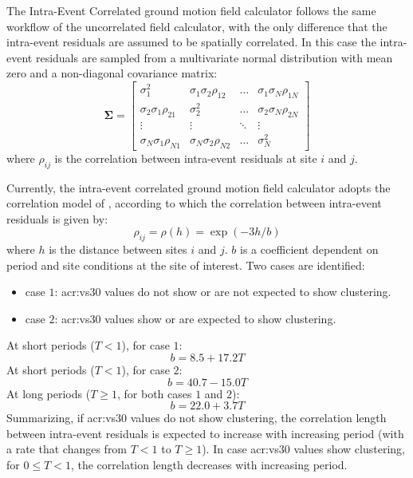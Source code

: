 The Intra-Event Correlated ground motion field calculator follows the same 
workflow of the uncorrelated field calculator, with the only difference that 
the intra-event residuals are assumed to be spatially correlated. 
%
In this case the intra-event residuals are sampled from a multivariate 
normal distribution with mean zero and a non-diagonal covariance matrix:
\begin{equation}
\bm{\Sigma}=
\begin{bmatrix}
\sigma^{2}_{1} &  \sigma_{1}\sigma_{2}\rho_{12}  & \ldots &  \sigma_{1}\sigma_{N}\rho_{1N}\\
\sigma_{2}\sigma_{1}\rho_{21}  &  \sigma^{2}_{2} & \ldots &  \sigma_{2}\sigma_{N}\rho_{2N}\\
\vdots & \vdots & \ddots & \vdots\\
\sigma_{N}\sigma_{1}\rho_{N1}  &   \sigma_{N}\sigma_{2}\rho_{N2}       &\ldots & \sigma^{2}_{N}
\end{bmatrix}
\end{equation}
where $\rho_{ij}$ is the correlation between intra-event residuals at site 
$i$ and $j$.

Currently, the intra-event correlated ground motion field calculator adopts 
the correlation model of \citet{jayaram2009}, according to which the 
correlation between intra-event residuals is given by:
 \begin{equation}
 \rho_{ij} = \rho(h) = \exp(-3h/b)
 \end{equation}
 where $h$ is the distance between sites $i$ and $j$. $b$ is a coefficient 
 dependent on period and site conditions at the site of interest. Two cases 
 are identified:
 \begin{itemize}
 \item case $1$: \gls{acr:vs30} values do not show or are not expected to show 
 clustering.
 \item case $2$: \gls{acr:vs30} values show or are expected to show 
 clustering.
 \end{itemize}
At short periods ($T<1$), for case $1$:
\begin{equation}
b = 8.5 + 17.2T
\end{equation}
At short periods ($T<1$), for case $2$:
\begin{equation}
b = 40.7 - 15.0T
\end{equation}
At long periods ($T\geq1$, for both cases $1$ and $2$):
\begin{equation}
b = 22.0 + 3.7T
\end{equation}
Summarizing, if \gls{acr:vs30} values do not show clustering, the 
correlation length between intra-event residuals is expected to 
increase with increasing period (with a rate that changes from 
$T<1$ to $T\geq1$). 
%
In case \gls{acr:vs30} values show clustering, for  $0\leq T<1$, the 
correlation length decreases with increasing period.

